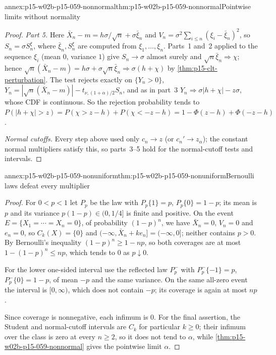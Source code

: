 \begin{annexitem}{annex:p15-w02b-p15-059-nonnormal}{thm:p15-w02b-p15-059-nonnormal}{Pointwise limits without normality}
\begin{proof}
\emph{Part 5.} Here \(\bar X_n-m=h\sigma/\sqrt n+\sigma\bar\xi_n\) and
\(V_n=\sigma^2\sum_{i\leq n}(\xi_i-\bar\xi_n)^2\), so \(S_n=\sigma S_n^\xi\),
where \(\bar\xi_n,S_n^\xi\) are computed from \(\xi_1,\ldots,\xi_n\). Parts~1
and~2 applied to the sequence \(\xi_i\) (mean \(0\), variance \(1\)) give
\(S_n\to\sigma\) almost surely and \(\sqrt n\bar\xi_n\Rightarrow\chi\);
hence \(\sqrt n(\bar X_n-m)=h\sigma+\sigma\sqrt n\bar\xi_n\Rightarrow
\sigma(h+\chi)\) by \cref{thm:p15-clt-perturbation}. The test rejects
exactly on \(\{Y_n>0\}\),
\(Y_n=|\sqrt n(\bar X_n-m)|-t_{\nu,(1+\alpha)/2}S_n\), and as in part~3
\(Y_n\Rightarrow\sigma|h+\chi|-z\sigma\), whose CDF is continuous. So the
rejection probability tends to
\(P(|h+\chi|>z)=P(\chi>z-h)+P(\chi<-z-h)=1-\Phi(z-h)+\Phi(-z-h)\).

\emph{Normal cutoffs.} Every step above used only \(c_n\to z\) (or
\(c_n'\to z_\alpha\)); the constant normal multipliers satisfy this, so
parts~3--5 hold for the normal-cutoff tests and intervals.
\end{proof}
\end{annexitem}

\begin{annexitem}{annex:p15-w02b-p15-059-nonuniform}{thm:p15-w02b-p15-059-nonuniform}{Bernoulli laws defeat every multiplier}
\begin{proof}
For \(0<p<1\) let \(P_p\) be the law with \(P_p\{1\}=p\),
\(P_p\{0\}=1-p\); its mean is \(p\) and its variance \(p(1-p)\in(0,1/4]\)
is finite and positive. On the event
\(E=\{X_1=\cdots=X_n=0\}\), of probability \((1-p)^n\), we have
\(\bar X_n=0\), \(V_n=0\) and \(e_n=0\), so
\(C_k(X)=\{0\}\) and \((-\infty,\bar X_n+ke_n]=(-\infty,0]\); neither
contains \(p>0\). By Bernoulli's inequality \((1-p)^n\geq1-np\), so both
coverages are at most \(1-(1-p)^n\leq np\), which tends to \(0\) as
\(p\downarrow0\).

For the lower one-sided interval use the reflected law \(P_p^-\) with
\(P_p^-\{-1\}=p\), \(P_p^-\{0\}=1-p\), of mean \(-p\) and the same
variance. On the same all-zero event the interval is \([0,\infty)\), which
does not contain \(-p\); its coverage is again at most \(np\).

Since coverage is nonnegative, each infimum is \(0\). For the final
assertion, the Student and normal-cutoff intervals are \(C_k\) for
particular \(k\geq0\); their infimum over the class is zero at every
\(n\geq2\), so it does not tend to \(\alpha\), while
\cref{thm:p15-w02b-p15-059-nonnormal} gives the pointwise limit \(\alpha\).
\end{proof}
\end{annexitem}

